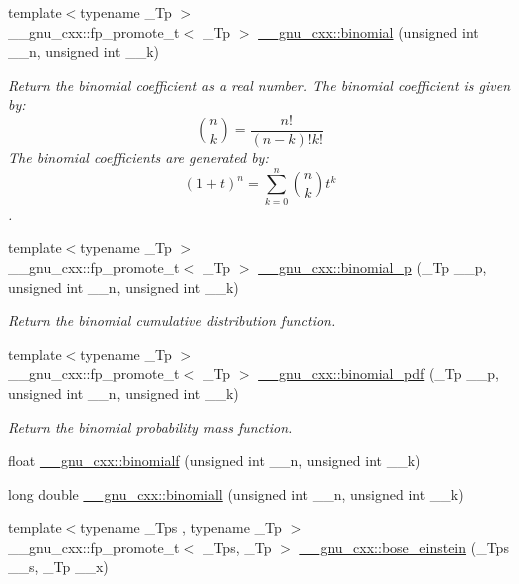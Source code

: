 \begin{DoxyCompactItemize}
\item 
{\footnotesize template$<$typename \+\_\+\+Tp $>$ }\\\+\_\+\+\_\+gnu\+\_\+cxx\+::fp\+\_\+promote\+\_\+t$<$ \+\_\+\+Tp $>$ \hyperlink{group__gnu__math__spec__func_gabd0cf6e3f1e1d36c4c45f118e34a5ca2}{\+\_\+\+\_\+gnu\+\_\+cxx\+::binomial} (unsigned int \+\_\+\+\_\+n, unsigned int \+\_\+\+\_\+k)
\begin{DoxyCompactList}\small\item\em Return the binomial coefficient as a real number. The binomial coefficient is given by\+: \[ \binom{n}{k} = \frac{n!}{(n-k)! k!} \] The binomial coefficients are generated by\+: \[ \left(1 + t\right)^n = \sum_{k=0}^n \binom{n}{k} t^k \]. \end{DoxyCompactList}\item 
{\footnotesize template$<$typename \+\_\+\+Tp $>$ }\\\+\_\+\+\_\+gnu\+\_\+cxx\+::fp\+\_\+promote\+\_\+t$<$ \+\_\+\+Tp $>$ \hyperlink{group__gnu__math__spec__func_ga54276b9f03ad7b10e991b1681e0d2dd3}{\+\_\+\+\_\+gnu\+\_\+cxx\+::binomial\+\_\+p} (\+\_\+\+Tp \+\_\+\+\_\+p, unsigned int \+\_\+\+\_\+n, unsigned int \+\_\+\+\_\+k)
\begin{DoxyCompactList}\small\item\em Return the binomial cumulative distribution function. \end{DoxyCompactList}\item 
{\footnotesize template$<$typename \+\_\+\+Tp $>$ }\\\+\_\+\+\_\+gnu\+\_\+cxx\+::fp\+\_\+promote\+\_\+t$<$ \+\_\+\+Tp $>$ \hyperlink{group__gnu__math__spec__func_gab726f5ed3181466baa0374e723ab5fb2}{\+\_\+\+\_\+gnu\+\_\+cxx\+::binomial\+\_\+pdf} (\+\_\+\+Tp \+\_\+\+\_\+p, unsigned int \+\_\+\+\_\+n, unsigned int \+\_\+\+\_\+k)
\begin{DoxyCompactList}\small\item\em Return the binomial probability mass function. \end{DoxyCompactList}\item 
float \hyperlink{group__gnu__math__spec__func_ga3882a077dacc6e627ca48abc05d7db48}{\+\_\+\+\_\+gnu\+\_\+cxx\+::binomialf} (unsigned int \+\_\+\+\_\+n, unsigned int \+\_\+\+\_\+k)
\item 
long double \hyperlink{group__gnu__math__spec__func_ga57602195f9215f735793c11d3210ac93}{\+\_\+\+\_\+gnu\+\_\+cxx\+::binomiall} (unsigned int \+\_\+\+\_\+n, unsigned int \+\_\+\+\_\+k)
\item 
{\footnotesize template$<$typename \+\_\+\+Tps , typename \+\_\+\+Tp $>$ }\\\+\_\+\+\_\+gnu\+\_\+cxx\+::fp\+\_\+promote\+\_\+t$<$ \+\_\+\+Tps, \+\_\+\+Tp $>$ \hyperlink{group__gnu__math__spec__func_gae8135b6861a48f2cee2e692093a17102}{\+\_\+\+\_\+gnu\+\_\+cxx\+::bose\+\_\+einstein} (\+\_\+\+Tps \+\_\+\+\_\+s, \+\_\+\+Tp \+\_\+\+\_\+x)

\end{DoxyCompactItemize}
